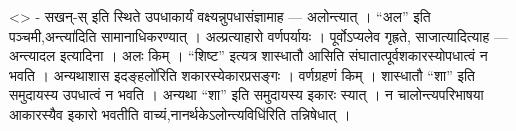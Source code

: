 \textless{}\textgreater{} - सखन्-स् इति स्थिते उपधाकार्यं
वक्ष्यन्नुपधासंज्ञामाह --- अलोन्त्यात् । ``अल'' इति पञ्चमी,अन्त्या॑दिति
सामानाधिकरण्यात् । अल्प्रत्याहारो वर्णपर्यायः । पूर्वोऽप्यलेव गृह्रते,
साजात्यादित्याह --- अन्त्यादल इत्यादिना । अलः किम् । ``शिष्ट'' इत्यत्र
शास्धातौ आसिति संघातात्पूर्वशकारस्योपधात्वं न भवति । अन्यथाशास
इदङ्हलो॑रिति शकारस्येकारप्रसङ्गः । वर्णग्रहणं किम् । शास्धातौ ``शा'' इति
समुदायस्य उपधात्वं न भवति । अन्यथा ``शा'' इति समुदायस्य इकारः स्यात् । न
चालोन्त्यपरिभाषया आकारस्यैव इकारो भवतीति
वाच्यं,नानर्थकेऽलोन्त्यविधि॑रिति तन्निषेधात् ।
